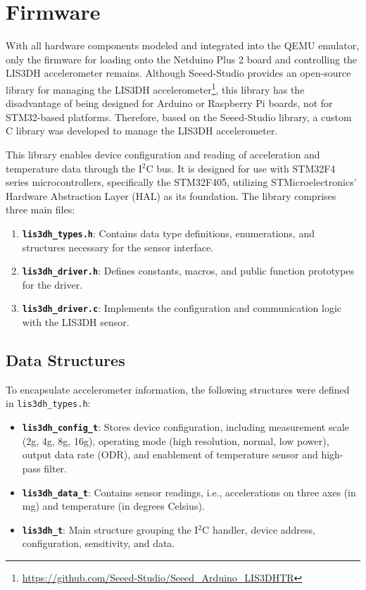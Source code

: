 \section{Firmware}
\label{chap:imp_firmware}

With all hardware components modeled and integrated into the QEMU emulator, only 
the firmware for loading onto the Netduino Plus 2 board and controlling the LIS3DH 
accelerometer remains. Although Seeed-Studio provides an open-source library for 
managing the LIS3DH accelerometer\footnote{\url{https://github.com/Seeed-Studio/Seeed_Arduino_LIS3DHTR}}, 
this library has the disadvantage of being designed for Arduino or Raspberry Pi 
boards, not for STM32-based platforms. Therefore, based on the Seeed-Studio library, 
a custom C library was developed to manage the LIS3DH accelerometer.

This library enables device configuration and reading of acceleration and 
temperature data through the I$^2$C bus. It is designed for use with STM32F4 series 
microcontrollers, specifically the STM32F405, utilizing STMicroelectronics' 
Hardware Abstraction Layer (HAL) as its foundation. The library comprises three main files:

\begin{enumerate}
    \item \textbf{\texttt{lis3dh\_types.h}}: Contains data type definitions, 
    enumerations, and structures necessary for the sensor interface.
    
    \item \textbf{\texttt{lis3dh\_driver.h}}: Defines constants, macros, and public 
    function prototypes for the driver.
    
    \item \textbf{\texttt{lis3dh\_driver.c}}: Implements the configuration and 
    communication logic with the LIS3DH sensor.
\end{enumerate}

\subsection{Data Structures}

To encapsulate accelerometer information, the following structures were defined in 
\texttt{lis3dh\_types.h}:

\begin{itemize}
    \item \textbf{\texttt{lis3dh\_config\_t}}: Stores device configuration, including 
    measurement scale (2g, 4g, 8g, 16g), operating mode (high resolution, normal, 
    low power), output data rate (ODR), and enablement of temperature sensor and 
    high-pass filter.
    
    \item \textbf{\texttt{lis3dh\_data\_t}}: Contains sensor readings, i.e., 
    accelerations on three axes (in mg) and temperature (in degrees Celsius).
    
    \item \textbf{\texttt{lis3dh\_t}}: Main structure grouping the I$^2$C handler, 
    device address, configuration, sensitivity, and data.
\end{itemize}

